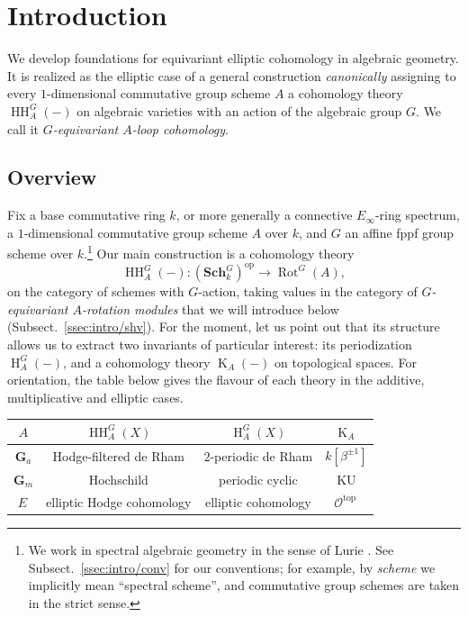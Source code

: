 \documentclass[12pt, oneside]{amsart}
\numberwithin{equation}{section}
\theoremstyle{remark}
\theoremstyle{plain}
\newcommand{\GGa}{\mathbf{G}_{a}}
\newcommand{\GGm}{\mathbf{G}_{m}}
\newcommand{\Sch}{\mathbf{Sch}_{k}}
\newcommand{\HH}{\operatorname{HH}}
\newcommand{\Hcoh}{\operatorname{H}}
\newcommand{\K}{\operatorname{K}}
\newcommand{\Rot}{\operatorname{Rot}}
\begin{document}
\vfill
\clearpage
\endgroup

\tableofcontents

\section{Introduction}

We develop foundations for equivariant elliptic cohomology in algebraic geometry.
It is realized as the elliptic case of a general construction \emph{canonically} assigning to every $1$-dimensional commutative group scheme $A$ a cohomology theory $\HH_A^G(-)$ on algebraic varieties with an action of the algebraic group $G$.
We call it \emph{$G$-equivariant $A$-loop cohomology}.

\subsection{Overview}\label{ssec:intro/coh}

Fix a base commutative ring $k$, or more generally a connective $E_\infty$-ring spectrum, a $1$-dimensional commutative group scheme $A$ over $k$, and $G$ an affine fppf group scheme over $k$.\footnote{%
  We work in spectral algebraic geometry in the sense of Lurie \cite{SAG}.
  See Subsect.~\ref{ssec:intro/conv} for our conventions; for example, by \emph{scheme} we implicitly mean ``spectral scheme'', and commutative group schemes are taken in the strict sense.
}
Our main construction is a cohomology theory
\[
  \HH_A^G(-) : (\Sch^G)^{\mathrm{op}} \longrightarrow \Rot^G(A),
\]
on the category of schemes with $G$-action, taking values in the category of \emph{$G$-equivariant $A$-rotation modules} that we will introduce below (Subsect.~\ref{ssec:intro/shv}).
For the moment, let us point out that its structure allows us to extract two invariants of particular interest: its periodization $\Hcoh_A^G(-)$, and a cohomology theory $\K_A(-)$ on topological spaces.
For orientation, the table below gives the flavour of each theory in the additive, multiplicative and elliptic cases.

\medskip
\begin{center}
\small
\renewcommand{\arraystretch}{1.15}
\setlength{\tabcolsep}{6pt}
\begin{tabular}{cccc}
  \toprule
  $A$ & $\HH_A^G(X)$ & $\Hcoh_A^G(X)$ & $\K_A$ \\ \midrule
  $\GGa$ & Hodge-filtered de Rham & $2$-periodic de Rham & $k[\beta^{\pm 1}]$ \\
  $\GGm$ & Hochschild & periodic cyclic & $\mathrm{KU}$ \\
  $E$\,\footnotemark & elliptic Hodge cohomology & elliptic cohomology & $\mathcal{O}^{\mathrm{top}}$\,\footnotemark \\
  \bottomrule
\end{tabular}
\end{center}
\addtocounter{footnote}{-1}
\medskip
\end{document}
